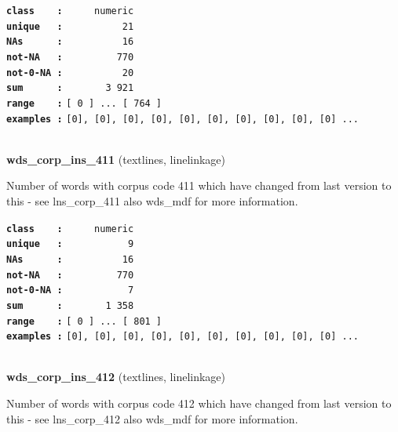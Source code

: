 \documentclass[]{article}
\begin{document}
\textbf{\texttt{class\ \ \ \ :}} \texttt{~~~~~numeric}\\
\textbf{\texttt{unique\ \ \ :}} \texttt{~~~~~~~~~~21}\\
\textbf{\texttt{NAs\ \ \ \ \ \ :}} \texttt{~~~~~~~~~~16}\\
\textbf{\texttt{not-NA\ \ \ :}} \texttt{~~~~~~~~~770}\\
\textbf{\texttt{not-0-NA\ :}} \texttt{~~~~~~~~~~20}\\
\textbf{\texttt{sum\ \ \ \ \ \ :}} \texttt{~~~~~~~3~921}\\
\textbf{\texttt{range\ \ \ \ :}}
\texttt{{[}\ 0\ {]}\ ...\ {[}\ 764\ {]}}\\
\textbf{\texttt{examples\ :}}
\texttt{{[}0{]},\ {[}0{]},\ {[}0{]},\ {[}0{]},\ {[}0{]},\ {[}0{]},\ {[}0{]},\ {[}0{]},\ {[}0{]},\ {[}0{]}\ ...}\\

~

\textbf{wds\_corp\_ins\_411} (textlines, linelinkage)

Number of words with corpus code 411 which have changed from last
version to this - see lns\_corp\_411 also wds\_mdf for more information.

\textbf{\texttt{class\ \ \ \ :}} \texttt{~~~~~numeric}\\
\textbf{\texttt{unique\ \ \ :}} \texttt{~~~~~~~~~~~9}\\
\textbf{\texttt{NAs\ \ \ \ \ \ :}} \texttt{~~~~~~~~~~16}\\
\textbf{\texttt{not-NA\ \ \ :}} \texttt{~~~~~~~~~770}\\
\textbf{\texttt{not-0-NA\ :}} \texttt{~~~~~~~~~~~7}\\
\textbf{\texttt{sum\ \ \ \ \ \ :}} \texttt{~~~~~~~1~358}\\
\textbf{\texttt{range\ \ \ \ :}}
\texttt{{[}\ 0\ {]}\ ...\ {[}\ 801\ {]}}\\
\textbf{\texttt{examples\ :}}
\texttt{{[}0{]},\ {[}0{]},\ {[}0{]},\ {[}0{]},\ {[}0{]},\ {[}0{]},\ {[}0{]},\ {[}0{]},\ {[}0{]},\ {[}0{]}\ ...}\\

~

\textbf{wds\_corp\_ins\_412} (textlines, linelinkage)

Number of words with corpus code 412 which have changed from last
version to this - see lns\_corp\_412 also wds\_mdf for more information.
\end{document}
